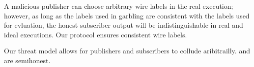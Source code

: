 A malicious publisher can choose arbitrary wire labels in the real execution;
however, as long as the labels used in garbling are consistent with the labels
used for evluation, the honest subscriber output will be indistinguishable in
real and ideal executions. Our protocol ensures consistent wire labels. 

Our threat model allows for publishers and subscribers to collude aribitrailly.
\broker and \garbler are semihonest.


%
%
%
%
%
%
%
%
%
